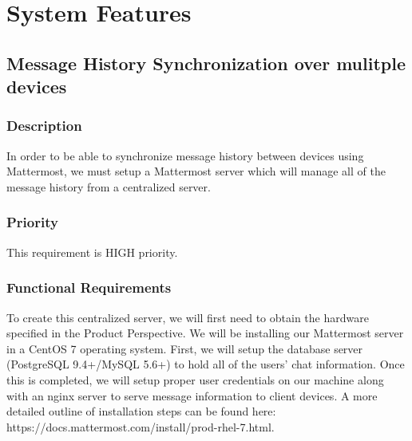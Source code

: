 \documentclass{scrreprt}
\begin{document}
%


\chapter{System Features}

\section{Message History Synchronization over mulitple devices}
\subsection{Description}
In order to be able to synchronize message history between devices using
Mattermost, we must setup a Mattermost server which will manage all of the
message history from a centralized server.
\subsection{Priority}
This requirement is HIGH priority.
\subsection{Functional Requirements}
To create this centralized server, we will first need to obtain the hardware
specified in the Product Perspective.  We will be installing our Mattermost
server in a CentOS 7 operating system.
First, we will setup the
database server (PostgreSQL 9.4+/MySQL 5.6+) to hold all of the users' chat
information.  Once this is completed, we will setup proper user credentials on
our machine along with an nginx server to serve message information to client
devices.  A more detailed outline of installation steps can be found here:
https://docs.mattermost.com/install/prod-rhel-7.html.
\end{document}
